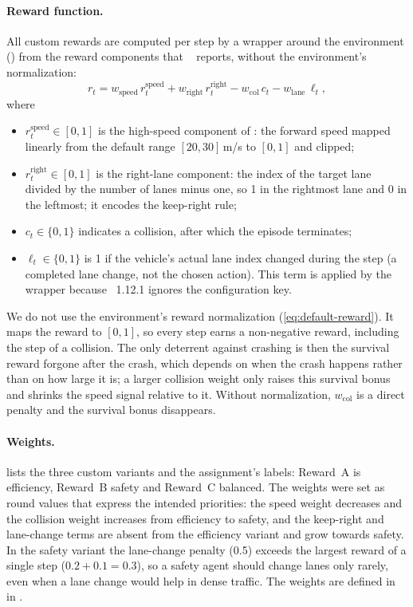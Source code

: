 \paragraph{Reward function.}
All custom rewards are computed per step by a wrapper around the environment () from the
reward components that ~\cite{highway-env} reports, without the environment's normalization:
\begin{equation}
  r_t = w_{\mathrm{speed}}\, r^{\mathrm{speed}}_t + w_{\mathrm{right}}\, r^{\mathrm{right}}_t
        - w_{\mathrm{col}}\, c_t - w_{\mathrm{lane}}\, \ell_t,
  \label{eq:reward}
\end{equation}
where
\begin{itemize}
  \item $r^{\mathrm{speed}}_t \in [0,1]$ is the high-speed component of : the forward speed mapped
  linearly from the default range $[20, 30]$\,m/s to $[0,1]$ and clipped;
  \item $r^{\mathrm{right}}_t \in [0,1]$ is the right-lane component: the index of the target lane divided by the
  number of lanes minus one, so 1 in the rightmost lane and 0 in the leftmost; it encodes the keep-right rule;
  \item $c_t \in \{0,1\}$ indicates a collision, after which the episode terminates;
  \item $\ell_t \in \{0,1\}$ is 1 if the vehicle's actual lane index changed during the step (a completed lane change,
  not the chosen action). This term is applied by the wrapper because ~1.12.1 ignores the
   configuration key.
\end{itemize}
We do not use the environment's reward normalization (\cref{eq:default-reward}). It maps the reward to $[0,1]$,
so every step earns a non-negative reward, including the step of a collision. The only deterrent against crashing is
then the survival reward forgone after the crash, which depends on when the crash happens rather than on how large it
is; a larger collision weight only raises this survival bonus and shrinks the speed signal relative to it. Without
normalization, $w_{\mathrm{col}}$ is a direct penalty and the survival bonus disappears.

\paragraph{Weights.}
 lists the three custom variants and the assignment's labels: Reward~A is efficiency,
Reward~B safety and Reward~C balanced. The weights were set as round values that express the
intended priorities: the speed weight decreases and the collision weight increases from efficiency to safety, and
the keep-right and lane-change terms are absent from the efficiency variant and grow towards safety. In the safety
variant the lane-change penalty (0.5) exceeds the largest reward of a single step ($0.2 + 0.1 = 0.3$), so a safety
agent should change lanes only rarely, even when a lane change would help in dense traffic. The weights are defined
in  in .

